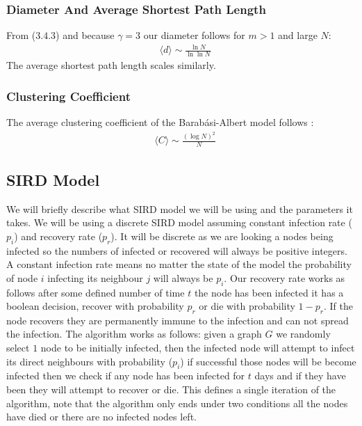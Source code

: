 \documentclass{article}
\begin{document}
            \subsubsection{Diameter And Average Shortest Path Length}
            From ($3.4.3$) and because $\gamma = 3$ our diameter follows for $m>1$ and large $N$:
            \begin{align*}
                &\langle d \rangle \sim \frac{\ln N}{\ln \ln N}
            \end{align*}
            The average shortest path length scales similarly.
            \subsubsection{Clustering Coefficient}
            The average clustering coefficient of the Barabási-Albert model follows \parencite{barabasi2013network}\parencite{klemm2002growing}:
            \begin{align*}
                &\langle C \rangle \sim \frac{(\log N)^2}{N}
            \end{align*}
        \subsection{SIRD Model}
        We will briefly describe what SIRD model we will be using and the parameters it takes. We will be using a discrete SIRD model assuming constant infection rate ($p_i$) and recovery rate ($p_r$). It will be discrete as we are looking a nodes being infected so the numbers of infected or recovered will always be positive integers. A constant infection rate means no matter the state of the model the probability of node $i$ infecting its neighbour $j$ will always be $p_i$. Our recovery rate works as follows after some defined number of time $t$ the node has been infected it has a boolean decision, recover with probability $p_r$ or die with probability $1-p_r$. If the node recovers they are permanently immune to the infection and can not spread the infection. The algorithm works as follows: given a graph $G$ we randomly select $1$ node to be initially infected, then the infected node will attempt to infect its direct neighbours with probability ($p_i$) if successful those nodes will be become infected then we check if any node has been infected for $t$ days and if they have been they will attempt to recover or die. This defines a single iteration of the algorithm, note that the algorithm only ends under two conditions all the nodes have died or there are no infected nodes left.
\end{document}
